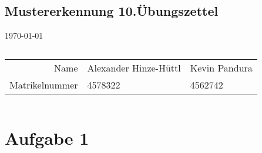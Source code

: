 \documentclass[a4paper,10pt]{article}
\begin{document}
\begin{center}
    \section*{Mustererkennung 10.Übungszettel}
     \today
\end{center}
$ $
\newline
\begin{tabular}{r|l l}
    Name & Alexander Hinze-Hüttl & Kevin Pandura\\
    Matrikelnummer & 4578322 & 4562742\\
\end{tabular}
\newline
$ $
\newline
\newline

\section{Aufgabe 1}
\end{document}
